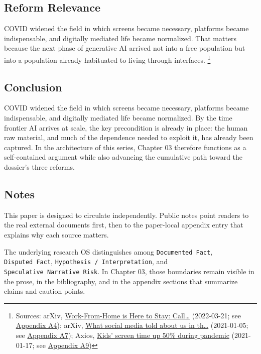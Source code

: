 \documentclass[
  american,
  11pt,
  letterpaper,
]{article}
\begin{document}
\subsection{Reform Relevance}\label{reform-relevance-3}

COVID widened the field in which screens became necessary, platforms
became indispensable, and digitally mediated life became normalized.
That matters because the next phase of generative AI arrived not into a
free population but into a population already habituated to living
through interfaces. \footnote{Sources: arXiv,
  \href{https://arxiv.org/abs/2203.11136}{Work-From-Home is Here to
  Stay: Call\ldots{}} (2022-03-21; see
  \hyperref[ch-03-appendix-a4-work-from-home-is-here-to-stay-call-for-flexibility-in-post-pandemic-work-policies]{Appendix
  A4}); arXiv, \href{https://arxiv.org/abs/2101.01688}{What social media
  told about us in th\ldots{}} (2021-01-05; see
  \hyperref[ch-03-appendix-a7-what-social-media-told-about-us-in-the-time-of-covid-19-a-scoping-review]{Appendix
  A7}); Axios,
  \href{https://www.axios.com/2021/01/17/kids-screen-time-pandemic}{Kids'
  screen time up 50\% during pandemic} (2021-01-17; see
  \hyperref[ch-03-appendix-a9-kids-screen-time-up-50-during-pandemic]{Appendix
  A9})}

\subsection{Conclusion}\label{conclusion-3}

COVID widened the field in which screens became necessary, platforms
became indispensable, and digitally mediated life became normalized. By
the time frontier AI arrives at scale, the key precondition is already
in place: the human raw material, and much of the dependence needed to
exploit it, has already been captured. In the architecture of this
series, Chapter 03 therefore functions as a self-contained argument
while also advancing the cumulative path toward the dossier's three
reforms.

\subsection{Notes}\label{notes-3}

This paper is designed to circulate independently. Public notes point
readers to the real external documents first, then to the paper-local
appendix entry that explains why each source matters.

The underlying research OS distinguishes among
\texttt{Documented\ Fact}, \texttt{Disputed\ Fact},
\texttt{Hypothesis\ /\ Interpretation}, and
\texttt{Speculative\ Narrative\ Risk}. In Chapter 03, those boundaries
remain visible in the prose, in the bibliography, and in the appendix
sections that summarize claims and caution points.
\end{document}
